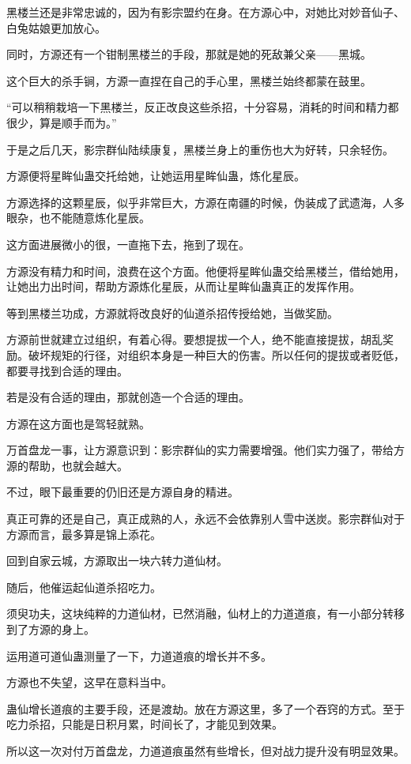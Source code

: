 \begin{this_body}
黑楼兰还是非常忠诚的，因为有影宗盟约在身。在方源心中，对她比对妙音仙子、白兔姑娘更加放心。

同时，方源还有一个钳制黑楼兰的手段，那就是她的死敌兼父亲——黑城。

这个巨大的杀手锏，方源一直捏在自己的手心里，黑楼兰始终都蒙在鼓里。

“可以稍稍栽培一下黑楼兰，反正改良这些杀招，十分容易，消耗的时间和精力都很少，算是顺手而为。”

于是之后几天，影宗群仙陆续康复，黑楼兰身上的重伤也大为好转，只余轻伤。

方源便将星眸仙蛊交托给她，让她运用星眸仙蛊，炼化星辰。

方源选择的这颗星辰，似乎非常巨大，方源在南疆的时候，伪装成了武遗海，人多眼杂，也不能随意炼化星辰。

这方面进展微小的很，一直拖下去，拖到了现在。

方源没有精力和时间，浪费在这个方面。他便将星眸仙蛊交给黑楼兰，借给她用，让她出力出时间，帮助方源炼化星辰，从而让星眸仙蛊真正的发挥作用。

等到黑楼兰功成，方源就将改良好的仙道杀招传授给她，当做奖励。

方源前世就建立过组织，有着心得。要想提拔一个人，绝不能直接提拔，胡乱奖励。破坏规矩的行径，对组织本身是一种巨大的伤害。所以任何的提拔或者贬低，都要寻找到合适的理由。

若是没有合适的理由，那就创造一个合适的理由。

方源在这方面也是驾轻就熟。

万首盘龙一事，让方源意识到：影宗群仙的实力需要增强。他们实力强了，带给方源的帮助，也就会越大。

不过，眼下最重要的仍旧还是方源自身的精进。

真正可靠的还是自己，真正成熟的人，永远不会依靠别人雪中送炭。影宗群仙对于方源而言，最多算是锦上添花。

回到自家云城，方源取出一块六转力道仙材。

随后，他催运起仙道杀招吃力。

须臾功夫，这块纯粹的力道仙材，已然消融，仙材上的力道道痕，有一小部分转移到了方源的身上。

运用道可道仙蛊测量了一下，力道道痕的增长并不多。

方源也不失望，这早在意料当中。

蛊仙增长道痕的主要手段，还是渡劫。放在方源这里，多了一个吞窍的方式。至于吃力杀招，只能是日积月累，时间长了，才能见到效果。

所以这一次对付万首盘龙，力道道痕虽然有些增长，但对战力提升没有明显效果。


\end{this_body}
